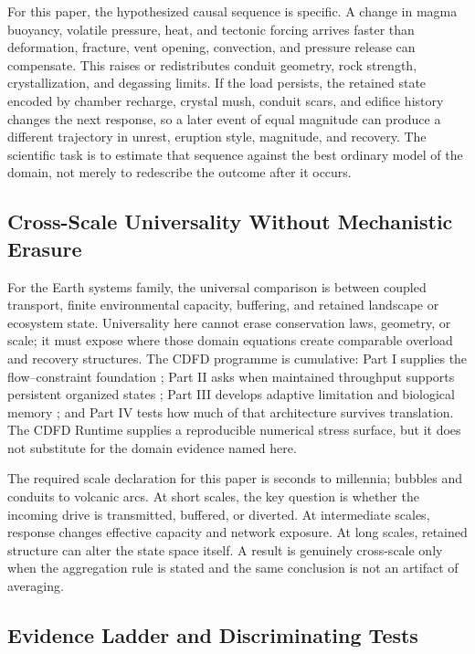 \documentclass[11pt,a4paper]{article}
\begin{document}
For this paper, the hypothesized causal sequence is specific. A change in
magma buoyancy, volatile pressure, heat, and tectonic forcing arrives faster than deformation, fracture, vent opening, convection, and pressure release can compensate.
This raises or redistributes conduit geometry, rock strength, crystallization, and degassing limits. If the load persists,
the retained state encoded by chamber recharge, crystal mush, conduit scars, and edifice history changes the next response, so a later event of equal
magnitude can produce a different trajectory in unrest, eruption style, magnitude, and recovery. The
scientific task is to estimate that sequence against the best ordinary model of
the domain, not merely to redescribe the outcome after it occurs.

\subsection{Cross-Scale Universality Without Mechanistic Erasure}

For the Earth systems family, the universal comparison is between coupled transport, finite environmental capacity, buffering, and retained landscape or ecosystem state. Universality here cannot erase conservation laws, geometry, or scale; it must expose where those domain equations create comparable overload and recovery structures. \cite{Holling1973,Turing1952,BakTangWiesenfeld1987}
The CDFD programme is cumulative: Part I supplies the flow--constraint
foundation \cite{MujjabiPartI2026}; Part II asks when maintained throughput
supports persistent organized states \cite{MujjabiPartII2026}; Part III
develops adaptive limitation and biological memory \cite{MujjabiPartIII2026};
and Part IV \cite{MujjabiPartIV2026} tests how much of that architecture
survives translation. The CDFD Runtime \cite{CDFDRuntime2026} supplies a
reproducible numerical stress surface, but it does not substitute for the
domain evidence named here.

The required scale declaration for this paper is seconds to millennia; bubbles and conduits to volcanic arcs. At short
scales, the key question is whether the incoming drive is transmitted,
buffered, or diverted. At intermediate scales, response changes effective
capacity and network exposure. At long scales, retained structure can alter the
state space itself. A result is genuinely cross-scale only when the aggregation
rule is stated and the same conclusion is not an artifact of averaging.

\subsection{Evidence Ladder and Discriminating Tests}
\end{document}
